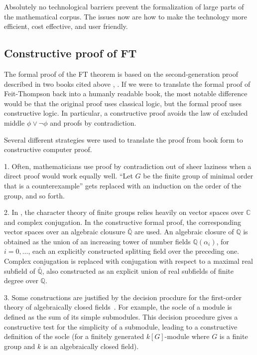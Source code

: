 \documentclass[brochure,english,12pt]{bourbaki}
\theoremstyle{plain}
\def\ring#1{{\mathbb{#1}}}
\begin{document}
Absolutely no technological barriers 
prevent the formalization of large parts of the mathematical corpus.  The issues now
are how to make the technology more efficient, cost effective, and user friendly.

\subsection{Constructive proof of FT}

The formal proof of the FT theorem is based on the second-generation proof described in
two books cited above \cite{bender1994local},  \cite{peterfalvi2000character}.
If we were to translate the formal proof of Feit-Thompson back into a humanly readable book, 
the most notable difference would be that the original proof uses classical logic,
but the formal proof uses constructive logic.  In particular, a constructive proof avoids
 the law of excluded middle $\phi\lor \neg \phi$ and proofs by contradiction.

Several different strategies were used to translate the proof from book form to
constructive computer proof.

1.  Often, mathematicians use proof by contradiction out of sheer laziness when a direct proof
would work equally well.  
``Let $G$ be the finite group of minimal order that is a counterexample'' gets
replaced with an induction on the order of the group, and so forth.

2. In \cite{peterfalvi2000character},  the character theory of finite groups relies heavily on 
vector spaces over $\ring{C}$ and complex conjugation.  In the constructive formal proof, the corresponding
vector spaces over an algebraic clousure $\bar{\ring{Q}}$ are used.  An algebraic closure of $\ring{Q}$ 
is obtained as the union of an increasing tower of  
number fields $\ring{Q}(\alpha_i)$, for $i=0,\ldots$, each  an explicitly constructed splitting field
over the preceding one.
Complex conjugation is replaced with
conjugation with respect to a maximal real subfield of $\bar{\ring{Q}}$, also constructed
as an explicit union of real subfields of finite degree over $\ring{Q}$.

3.  Some constructions are justified by the decision procdure for the first-order theory
of algebraically closed fields~\cite{Ha09}.  
For example, the socle of a module is defined as the sum of its
simple submodules.  This decision procedure gives a constructive test for the simplicity of a submodule,
leading to a constructive definition of the socle  (for a finitely generated 
$k[G]$-module where $G$ is a finite group and $k$ is an algebraically closed field).  
\end{document}
